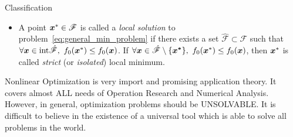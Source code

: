 \begin{note}{Classification}
\begin{enumerate}
\begin{itemize}
                \item A point \(\bm{x}^* \in \mathscr{F}\) is called a \emph{local solution} to problem~\ref{eq:general_min_problem} if there exists a set \(\hat{\mathscr{F}} \subset \mathscr{F}\) such that \(\forall \bm{x} \in \mathrm{int}\hat{\mathscr{F}}, ~f_0(\bm{x}^*) \le f_0(\bm{x})\). If \(\forall \bm{x} \in \hat{\mathscr{F}} \setminus \{\bm{{x}^*}\}, ~f_0(\bm{x}^*) \le f_0(\bm{x})\), then \(\bm{x}^*\) is called \emph{strict} (or \emph{isolated}) local minimum.
            \end{itemize}
    \end{enumerate}
\end{note}

Nonlinear Optimization is very import and promising application theory. It covers almost ALL needs of Operation Research and Numerical Analysis. However, in general, optimization problems should be UNSOLVABLE. It is difficult to believe in the existence of a universal tool which is able to solve all problems in the world.


